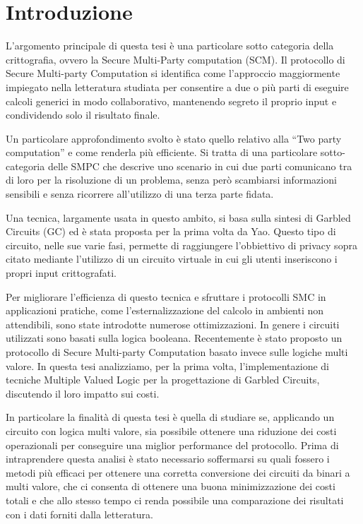 \documentclass[
  italian,
]{book}
\author{}
\date{\vspace{-2.5em}}
\begin{document}
{
\setcounter{tocdepth}{1}
\tableofcontents
}
\hypertarget{introduzione}{%
\chapter*{Introduzione}\label{introduzione}}

L'argomento principale di questa tesi è una particolare sotto categoria della crittografia, ovvero la Secure Multi-Party computation (SCM). Il protocollo di Secure Multi-party Computation si identifica come l'approccio maggiormente impiegato nella letteratura studiata per consentire a due o più parti di eseguire calcoli generici in modo collaborativo, mantenendo segreto il proprio input e condividendo solo il risultato finale.

Un particolare approfondimento svolto è stato quello relativo alla ``Two party computation'' e come renderla più efficiente.
Si tratta di una particolare sotto-categoria delle SMPC che descrive uno scenario in cui due parti comunicano tra di loro per la risoluzione di un problema, senza però scambiarsi informazioni sensibili e senza ricorrere all'utilizzo di una terza parte fidata. \citep{hemenway2014achieving}

Una tecnica, largamente usata in questo ambito, si basa sulla sintesi di Garbled Circuits (GC) ed è stata proposta per la prima volta da Yao. Questo tipo di circuito, nelle sue varie fasi, permette di raggiungere l'obbiettivo di privacy sopra citato mediante l'utilizzo di un circuito virtuale in cui gli utenti inseriscono i propri input crittografati.

Per migliorare l'efficienza di questo tecnica e sfruttare i protocolli SMC in applicazioni pratiche, come l'esternalizzazione del calcolo in ambienti non attendibili, sono state introdotte numerose ottimizzazioni. In genere i circuiti utilizzati sono basati sulla logica booleana. Recentemente è stato proposto un protocollo di Secure Multi-party Computation basato invece sulle logiche multi valore. In questa tesi analizziamo, per la prima volta, l'implementazione di tecniche Multiple Valued Logic per la progettazione di Garbled Circuits, discutendo il loro impatto sui costi.

In particolare la finalità di questa tesi è quella di studiare se, applicando un circuito con logica multi valore, sia possibile ottenere una riduzione dei costi operazionali per conseguire una miglior performance del protocollo. Prima di intraprendere questa analisi è stato necessario soffermarsi su quali fossero i metodi più efficaci per ottenere una corretta conversione dei circuiti da binari a multi valore, che ci consenta di ottenere una buona minimizzazione dei costi totali e che allo stesso tempo ci renda possibile una comparazione dei risultati con i dati forniti dalla letteratura. \citep{gao2002optimization}
\end{document}
